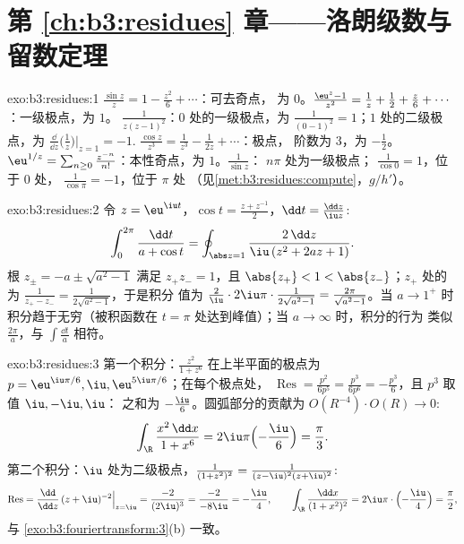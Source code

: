 \section*{第 \ref{ch:b3:residues} 章——洛朗级数与
留数定理}

\begin{solution}{exo:b3:residues:1}
$\frac{\sin z}z = 1 - \frac{z^2}6 + \cdots$：可去奇点，
为 $0$。$\frac{\eu^z - 1}{z^2} = \frac1z + \frac12 +
\frac z6 + \cdots$：一级极点，为 $1$。
$\frac1{z(z-1)^2}$：$0$ 处的一级极点，为
$\frac1{(0-1)^2} = 1$；$1$ 处的二级极点，为
$\frac{\dd}{\dd z}\bigl(\frac1z\bigr)\big|_{z=1} = -1$.
$\frac{\cos z}{z^3} = \frac1{z^3} - \frac1{2z} + \cdots$：极点，
阶数为 $3$，为 $-\frac12$。$\eu^{1/z} = \sum_{n\geq0}
\frac{z^{-n}}{n!}$：本性奇点，为 $1$。$\frac1{\sin z}$：
$n\pi$ 处为一级极点； $\frac1{\cos 0} = 1$，位于 $0$ 处，
 $\frac1{\cos\pi} = -1$，位于 $\pi$ 处
（见\cref{met:b3:residues:compute}，$g/h'$）。
\end{solution}

\begin{solution}{exo:b3:residues:2}
令 $z = \eu^{\iu t}$，$\cos t = \frac{z + z^{-1}}2$，$\dd t
= \frac{\dd z}{\iu z}$:
\[
\int_0^{2\pi}\frac{\dd t}{a + \cos t}
= \oint_{\abs z = 1}\frac{2\,\dd z}{\iu\,(z^2 + 2az + 1)} .
\]
根 $z_\pm = -a \pm \sqrt{a^2 - 1}$ 满足 $z_+z_- =
1$，且 $\abs{z_+} < 1 < \abs{z_-}$；$z_+$ 处的为
$\frac{1}{z_+ - z_-} = \frac1{2\sqrt{a^2-1}}$，于是积分
值为 $\frac2\iu\cdot2\iu\pi\cdot\frac1{2\sqrt{a^2-1}} =
\frac{2\pi}{\sqrt{a^2-1}}$。当 $a \to 1^+$ 时积分趋于无穷（被积函数在
$t = \pi$ 处达到峰值）；当 $a \to \infty$ 时，积分的行为
类似 $\frac{2\pi}a$，与 $\int\frac{\dd t}a$ 相符。
\end{solution}

\begin{solution}{exo:b3:residues:3}
第一个积分：$\frac{z^2}{1+z^6}$ 在上半平面的极点为 $p =
\eu^{\iu\pi/6}, \iu, \eu^{5\iu\pi/6}$；在每个极点处，
$\operatorname{Res} = \frac{p^2}{6p^5} = \frac{p^3}{6p^6} =
-\frac{p^3}6$，且 $p^3$ 取值 $\iu, -\iu, \iu$：
之和为 $-\frac{\iu}{6}$。圆弧部分的贡献为
$O(R^{-4})\cdot O(R) \to 0$:
\[
\int_\R\frac{x^2\,\dd x}{1 + x^6} =
2\iu\pi\Bigl(-\frac \iu6\Bigr) = \frac\pi3 .
\]
第二个积分：$\iu$ 处为二级极点，$\frac1{(1+z^2)^2} =
\frac1{(z-\iu)^2(z+\iu)^2}$:
\[
\operatorname{Res} = \frac{\dd}{\dd z}\,(z +
\iu)^{-2}\Big|_{z=\iu} = \frac{-2}{(2\iu)^3} =
\frac{-2}{-8\iu} = -\frac\iu4,
\qquad
\int_\R\frac{\dd x}{(1+x^2)^2} =
2\iu\pi\cdot\Bigl(-\frac\iu4\Bigr) = \frac\pi2 ,
\]
与 \cref{exo:b3:fouriertransform:3}(b) 一致。
\end{solution}

